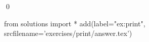 
\begin{ex} 
  \label{ex:print}
  
  \qed
\end{ex} 
\begin{python0}
from solutions import *
add(label="ex:print",
    srcfilename='exercises/print/answer.tex') 
\end{python0}
